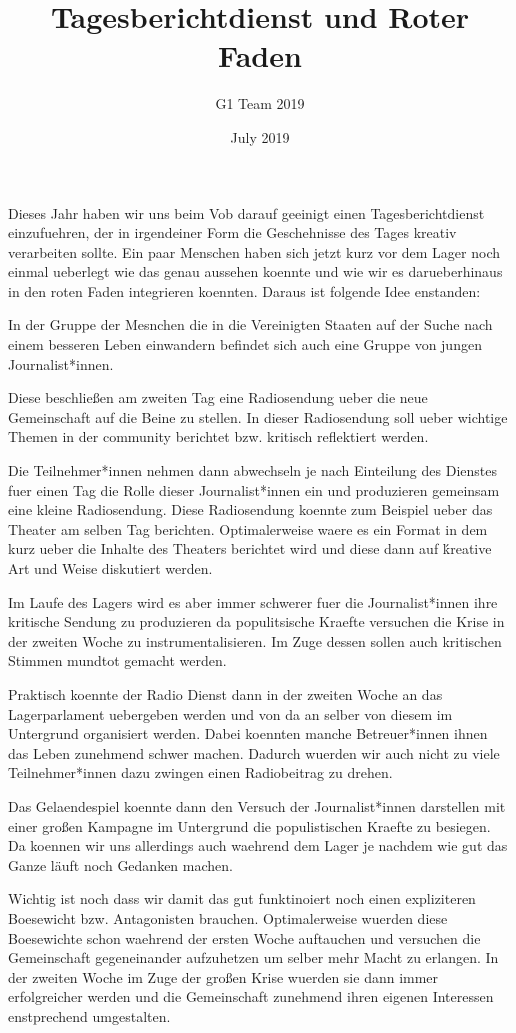 \documentclass[12pt]{article}
\title{Tagesberichtdienst und Roter Faden}
\author{G1 Team 2019}
\date{July 2019}
\begin{document}
\maketitle

Dieses Jahr haben wir uns beim Vob darauf geeinigt einen Tagesberichtdienst einzufuehren, der in irgendeiner Form die Geschehnisse des Tages kreativ verarbeiten sollte. 
Ein paar Menschen haben sich jetzt kurz vor dem Lager noch einmal ueberlegt wie das genau aussehen koennte und wie wir es darueberhinaus in den roten Faden integrieren koennten. 
Daraus ist folgende Idee enstanden: 


In der Gruppe der Mesnchen die in die Vereinigten Staaten auf der Suche nach einem besseren Leben einwandern befindet sich auch eine Gruppe von jungen Journalist*innen. 

Diese beschlie\ss en am zweiten Tag eine Radiosendung ueber die neue Gemeinschaft auf die Beine zu stellen. 
In dieser Radiosendung soll ueber wichtige Themen in der community berichtet bzw. kritisch reflektiert werden. 

Die Teilnehmer*innen nehmen dann abwechseln je nach Einteilung des Dienstes fuer einen Tag die Rolle dieser Journalist*innen ein und produzieren gemeinsam eine kleine Radiosendung. 
Diese Radiosendung koennte zum Beispiel ueber das Theater am selben Tag berichten. Optimalerweise waere es ein Format in dem kurz ueber die Inhalte des Theaters berichtet wird und diese dann auf ḱreative Art und Weise diskutiert werden. 

Im Laufe des Lagers wird es aber immer schwerer fuer die Journalist*innen ihre kritische Sendung zu produzieren da populitsische Kraefte versuchen die Krise in der zweiten Woche zu instrumentalisieren. 
Im Zuge dessen sollen auch kritischen Stimmen mundtot gemacht werden. 


Praktisch koennte der Radio Dienst dann in der zweiten Woche an das Lagerparlament uebergeben werden und von da an selber von diesem im Untergrund organisiert werden.
Dabei koennten manche Betreuer*innen ihnen das Leben zunehmend schwer machen. 
Dadurch wuerden wir auch nicht zu viele Teilnehmer*innen dazu zwingen einen Radiobeitrag zu drehen. 

Das Gelaendespiel koennte dann den Versuch der Journalist*innen darstellen mit einer großen Kampagne im Untergrund die populistischen Kraefte zu besiegen. 
Da koennen wir uns allerdings auch waehrend dem Lager je nachdem wie gut das Ganze läuft noch Gedanken machen. 

Wichtig ist noch dass wir damit das gut funktinoiert noch einen expliziteren Boesewicht bzw. Antagonisten brauchen.  
Optimalerweise wuerden diese Boesewichte schon waehrend der ersten Woche auftauchen und versuchen die Gemeinschaft gegeneinander aufzuhetzen um selber mehr Macht zu erlangen. In der zweiten Woche im Zuge der großen Krise wuerden sie dann immer erfolgreicher werden und die Gemeinschaft zunehmend ihren eigenen Interessen enstprechend umgestalten.    
\end{document}
